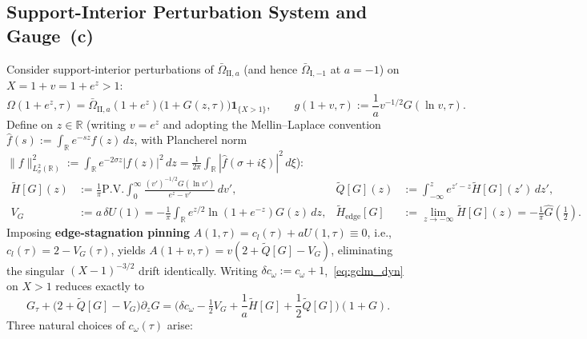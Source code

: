 \documentclass[11pt,a4paper]{article}
\begin{document}
\subsection{Support-Interior Perturbation System and Gauge~(c)}
Consider support-interior perturbations of $\bar\Omega_{\mathrm{II},a}$ (and hence $\bar\Omega_{\mathrm{I},-1}$ at $a = -1$) on $X = 1 + v = 1 + e^z > 1$:
\[
\Omega(1+e^z,\tau) = \bar\Omega_{\mathrm{II},a}(1+e^z)\big(1 + G(z,\tau)\big)\mathbf{1}_{\{X>1\}}, \qquad g(1+v,\tau) := \frac{1}{a}v^{-1/2}G(\ln v,\tau).
\]
Define on $z \in \mathbb{R}$ (writing $v = e^z$ and adopting the Mellin--Laplace convention $\widehat{f}(s) := \int_{\mathbb{R}} e^{-sz}f(z)\,dz$, with Plancherel norm $\|f\|_{L^2_\sigma(\mathbb{R})}^2 := \int_{\mathbb{R}} e^{-2\sigma z}|f(z)|^2\,dz = \frac{1}{2\pi}\int_{\mathbb{R}} |\widehat{f}(\sigma+i\xi)|^2\,d\xi$):
\begin{align*}
\widetilde{H}[G](z) &:= \frac{1}{\pi}\mathrm{P.V.}\int_0^\infty \frac{(v')^{-1/2}G(\ln v')}{e^z - v'}\,dv', &
\widetilde{Q}[G](z) &:= \int_{-\infty}^z e^{z'-z}\widetilde{H}[G](z')\,dz', \\
V_G &:= a\,\delta U(1) = -\frac{1}{\pi}\int_{\mathbb{R}} e^{z/2}\ln(1+e^{-z})G(z)\,dz, &
\widetilde{H}_{\mathrm{edge}}[G] &:= \lim_{z\to-\infty}\widetilde{H}[G](z) = -\frac{1}{\pi}\widehat{G}\!\left(\tfrac{1}{2}\right).
\end{align*}
Imposing \textbf{edge-stagnation pinning} $A(1,\tau) = c_l(\tau) + a U(1,\tau) \equiv 0$, i.e., $c_l(\tau) = 2 - V_G(\tau)$, yields $A(1+v,\tau) = v(2 + \widetilde{Q}[G] - V_G)$, eliminating the singular $(X-1)^{-3/2}$ drift identically. Writing $\delta c_\omega := c_\omega + 1$,~\eqref{eq:gclm_dyn} on $X > 1$ reduces exactly to
\begin{equation}\label{eq:gclm_pert_gen}
G_\tau + \big(2 + \widetilde{Q}[G] - V_G\big)\partial_z G = \Big(\delta c_\omega - \tfrac{1}{2}V_G + \frac{1}{a}\widetilde{H}[G] + \frac{1}{2}\widetilde{Q}[G]\Big)(1 + G).
\end{equation}
Three natural choices of $c_\omega(\tau)$ arise:
\end{document}
